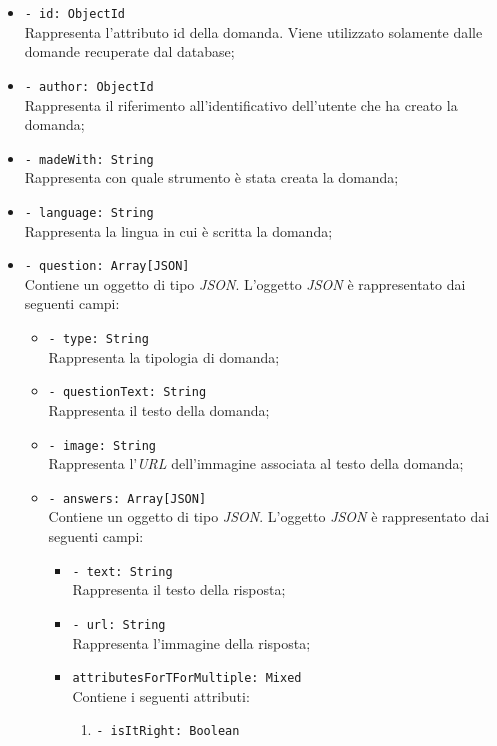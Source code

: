 \begin{itemize}
			\begin{itemize}
				\item \texttt{- id: ObjectId}\\
				Rappresenta l'attributo id della domanda. Viene utilizzato solamente dalle domande recuperate dal database;
				\item \texttt{- author: ObjectId}\\
				Rappresenta il riferimento all'identificativo dell'utente che ha creato la domanda;
				\item \texttt{- madeWith: String}\\ 
				Rappresenta con quale strumento è stata creata la domanda;
				\item \texttt{- language: String}\\
				Rappresenta la lingua in cui è scritta la domanda; 
				\item \texttt{- question: Array[JSON]}\\ 
				Contiene un oggetto di tipo \textit{JSON}. L'oggetto \textit{JSON} è rappresentato dai seguenti campi:
				\begin{itemize}
					\item \texttt{- type: String}\\
					Rappresenta la tipologia di domanda;
					\item \texttt{- questionText: String}\\ 
					Rappresenta il testo della domanda; 
					\item \texttt{- image: String}\\
					Rappresenta l'\textit{URL} dell'immagine associata al testo della domanda; 
					\item \texttt{- answers: Array[JSON]}\\ 
					Contiene un oggetto di tipo \textit{JSON}. L'oggetto \textit{JSON} è rappresentato dai seguenti campi:
					\begin{itemize}	 				  
						\item \texttt{- text: String}\\
						Rappresenta il testo della risposta;
						\item \texttt{- url: String}\\
						Rappresenta l'immagine della risposta;
						\item \texttt{attributesForTForMultiple: Mixed}\\
						Contiene i seguenti attributi:
						\begin{enumerate}
							\item \texttt{- isItRight: Boolean}\\

\end{enumerate}
\end{itemize}
\end{itemize}
\end{itemize}
\end{itemize}
